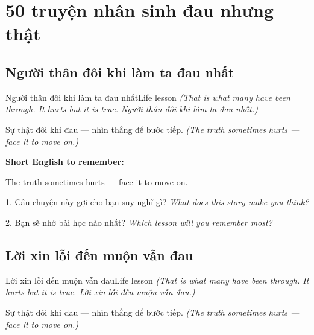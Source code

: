 \chapter{50 truyện nhân sinh đau nhưng thật}


\section{Người thân đôi khi làm ta đau nhất}
\begin{truyen}{Người thân đôi khi làm ta đau nhất}{Life lesson}
\textit{(That is what many have been through. It hurts but it is true. Người thân đôi khi làm ta đau nhất.)}
\end{truyen}

\begin{baihoc}
Sự thật đôi khi đau — nhìn thẳng để bước tiếp.
\textit{(The truth sometimes hurts — face it to move on.)}
\end{baihoc}

\begin{ghinhoanh}
\textbf{Short English to remember:}

The truth sometimes hurts — face it to move on.

\end{ghinhoanh}

\begin{tuhocnhanh}
1. Câu chuyện này gợi cho bạn suy nghĩ gì? \textit{What does this story make you think?}

2. Bạn sẽ nhớ bài học nào nhất? \textit{Which lesson will you remember most?}
\end{tuhocnhanh}
\ngancach


\section{Lời xin lỗi đến muộn vẫn đau}
\begin{truyen}{Lời xin lỗi đến muộn vẫn đau}{Life lesson}
\textit{(That is what many have been through. It hurts but it is true. Lời xin lỗi đến muộn vẫn đau.)}
\end{truyen}

\begin{baihoc}
Sự thật đôi khi đau — nhìn thẳng để bước tiếp.
\textit{(The truth sometimes hurts — face it to move on.)}
\end{baihoc}

